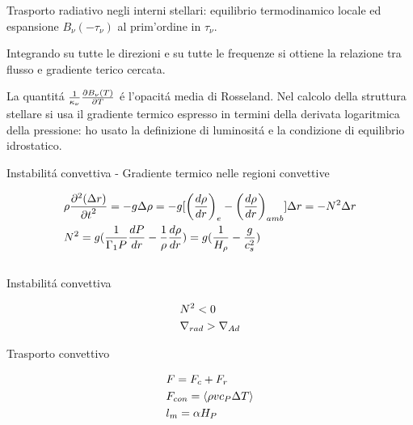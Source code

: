 \documentclass[10pt,xcolor={usenames},fleqn,mathserif,serif]{beamer}
\begin{document}
\begin{wordonframe}{Trasporto radiativo negli interni stellari: equilibrio termodinamico locale ed espansione $B_{\nu}(-\tau_{\nu})$ al prim'ordine in $\tau_{\nu}$.}
{%

Integrando su tutte le direzioni e su tutte le frequenze si ottiene la relazione tra flusso e gradiente terico cercata.

La quantit\'a $\frac{1}{\kappa_{\nu}}\PDy{T}{B_{\nu}(T)}$ \'e l'opacit\'a media di Rosseland. Nel calcolo della struttura stellare si usa il gradiente termico espresso in termini della derivata logaritmica della pressione: ho usato la definizione di luminosit\'a e la condizione di equilibrio idrostatico.

}

\end{wordonframe}


\begin{frame}{Instabilit\'a convettiva - Gradiente termico nelle regioni convettive}

\begin{align*}
&\rho\PtwoDy{t}{(\Delta r)}=-g\Delta\rho=-g[\Dcvar{\TDy{r}{\rho}}{e}-\Dcvar{\TDy{r}{\rho}}{amb}]\Delta r=-N^2\Delta r\\
&N^2=g(\frac{1}{\Gamma_1P}\TDy{r}{P}-\frac{1}{\rho}\TDy{r}{\rho})=g(\frac{1}{\densityscale{}}-\frac{g}{c_s^2})%
\end{align*}

\begin{columns}

\begin{column}{0.45\textwidth}

\begin{block}{Instabilit\'a convettiva}

\begin{align*}
&N^2<0\\
&\nrad{}>\nad{}
\end{align*}

\end{block}

\begin{block}{Trasporto convettivo}

\begin{align*}
&F=F_c+F_r\\
&F_{con}=\exv{\rho vc_P\Delta T}\\
&l_m=\alpha H_P
\end{align*}

\end{block}

\end{column}


\end{columns}
\end{frame}
\end{document}
